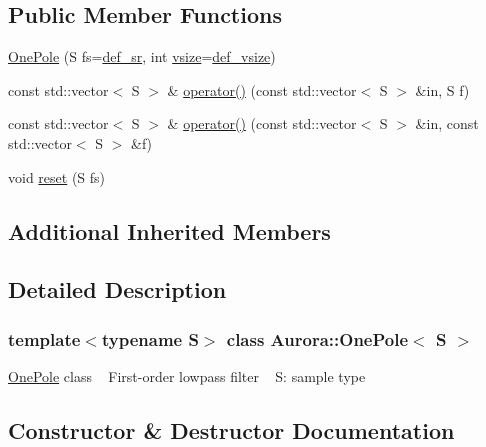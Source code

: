 \subsection*{Public Member Functions}
\begin{DoxyCompactItemize}
\item 
\hyperlink{class_aurora_1_1_one_pole_a58e01b113a37f1f05e4ae135acf056de}{One\+Pole} (S fs=\hyperlink{namespace_aurora_ad49263d809bea98dd422e95bc91bc03e}{def\+\_\+sr}, int \hyperlink{class_aurora_1_1_snd_base_af9e21aaf411b17f7a8221c991ce5d291}{vsize}=\hyperlink{namespace_aurora_afaaddf667a06e7ce23c667a8b7295263}{def\+\_\+vsize})
\item 
const std\+::vector$<$ S $>$ \& \hyperlink{class_aurora_1_1_one_pole_a34c297cdef0928ffd6e13e0603c5ef9d}{operator()} (const std\+::vector$<$ S $>$ \&in, S f)
\item 
const std\+::vector$<$ S $>$ \& \hyperlink{class_aurora_1_1_one_pole_ab126ef60b5f354c5aec0b62636bbb01d}{operator()} (const std\+::vector$<$ S $>$ \&in, const std\+::vector$<$ S $>$ \&f)
\item 
void \hyperlink{class_aurora_1_1_one_pole_ab9d69c4ceb9dbf5017fd800844f54dbf}{reset} (S fs)
\end{DoxyCompactItemize}
\subsection*{Additional Inherited Members}


\subsection{Detailed Description}
\subsubsection*{template$<$typename S$>$\newline
class Aurora\+::\+One\+Pole$<$ S $>$}

\hyperlink{class_aurora_1_1_one_pole}{One\+Pole} class ~\newline
First-\/order lowpass filter ~\newline
S\+: sample type 

\subsection{Constructor \& Destructor Documentation}
\mbox{\label{class_aurora_1_1_one_pole_a58e01b113a37f1f05e4ae135acf056de}} 
